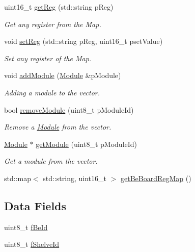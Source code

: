 \begin{DoxyCompactItemize}
uint16\-\_\-t \hyperlink{class_ph2___hw_description_1_1_be_board_ac25f4182e6340ca29d42ba9b861d8e67}{get\-Reg} (std\-::string p\-Reg)
\begin{DoxyCompactList}\small\item\em Get any register from the Map. \end{DoxyCompactList}\item 
void \hyperlink{class_ph2___hw_description_1_1_be_board_a933f9d5f715fbe9187f6aa79589cb55c}{set\-Reg} (std\-::string p\-Reg, uint16\-\_\-t pset\-Value)
\begin{DoxyCompactList}\small\item\em Set any register of the Map. \end{DoxyCompactList}\item 
void \hyperlink{class_ph2___hw_description_1_1_be_board_a5242925c065165be9b407dabf889ac9a}{add\-Module} (\hyperlink{class_ph2___hw_description_1_1_module}{Module} \&p\-Module)
\begin{DoxyCompactList}\small\item\em Adding a module to the vector. \end{DoxyCompactList}\item 
bool \hyperlink{class_ph2___hw_description_1_1_be_board_aba02e7319c8c41b569c583bfa2068215}{remove\-Module} (uint8\-\_\-t p\-Module\-Id)
\begin{DoxyCompactList}\small\item\em Remove a \hyperlink{class_ph2___hw_description_1_1_module}{Module} from the vector. \end{DoxyCompactList}\item 
\hyperlink{class_ph2___hw_description_1_1_module}{Module} $\ast$ \hyperlink{class_ph2___hw_description_1_1_be_board_a71b8e3e970d554d7642bea8a9d21b037}{get\-Module} (uint8\-\_\-t p\-Module\-Id)
\begin{DoxyCompactList}\small\item\em Get a module from the vector. \end{DoxyCompactList}\item 
std\-::map$<$ std\-::string, uint16\-\_\-t $>$ \hyperlink{class_ph2___hw_description_1_1_be_board_aff2710580b471a4209c240310cf23ba6}{get\-Be\-Board\-Reg\-Map} ()
\end{DoxyCompactItemize}
\subsection*{Data Fields}
\begin{DoxyCompactItemize}
\item 
uint8\-\_\-t \hyperlink{class_ph2___hw_description_1_1_be_board_aabe1a515a23ff8813d4641293a8b4ba1}{f\-Be\-Id}
\item 
uint8\-\_\-t \hyperlink{class_ph2___hw_description_1_1_be_board_a8e45d863c0a596466a78fd3e16ef92d1}{f\-Shelve\-Id}
\end{DoxyCompactItemize}
